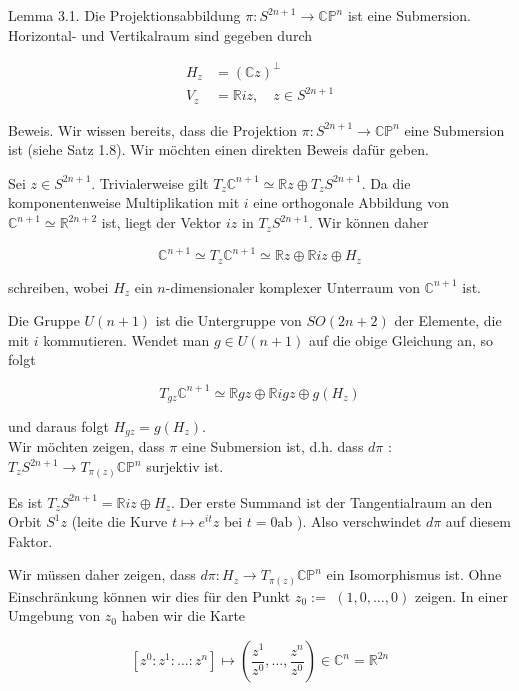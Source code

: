 \documentclass[10pt, letterpaper]{article}
\begin{document}
Lemma 3.1. Die Projektionsabbildung $\pi: S^{2 n+1} \rightarrow \mathbb{C P}^{n}$ ist eine Submersion. Horizontal- und Vertikalraum sind gegeben durch

$$
\begin{aligned}
H_{z} & =(\mathbb{C} z)^{\perp} \\
V_{z} & =\mathbb{R} i z, \quad z \in S^{2 n+1}
\end{aligned}
$$

Beweis. Wir wissen bereits, dass die Projektion $\pi: S^{2 n+1} \rightarrow \mathbb{C} \mathbb{P}^{n}$ eine Submersion ist (siehe Satz 1.8). Wir möchten einen direkten Beweis dafür geben.

Sei $z \in S^{2 n+1}$. Trivialerweise gilt $T_{z} \mathbb{C}^{n+1} \simeq \mathbb{R} z \oplus T_{z} S^{2 n+1}$. Da die komponentenweise Multiplikation mit $i$ eine orthogonale Abbildung von $\mathbb{C}^{n+1} \simeq \mathbb{R}^{2 n+2}$ ist, liegt der Vektor $i z$ in $T_{z} S^{2 n+1}$. Wir können daher

$$
\mathbb{C}^{n+1} \simeq T_{z} \mathbb{C}^{n+1} \simeq \mathbb{R} z \oplus \mathbb{R} i z \oplus H_{z}
$$

schreiben, wobei $H_{z}$ ein $n$-dimensionaler komplexer Unterraum von $\mathbb{C}^{n+1}$ ist.

Die Gruppe $U(n+1)$ ist die Untergruppe von $S O(2 n+2)$ der Elemente, die mit $i$ kommutieren. Wendet man $g \in U(n+1)$ auf die obige Gleichung an, so folgt

$$
T_{g z} \mathbb{C}^{n+1} \simeq \mathbb{R} g z \oplus \mathbb{R} i g z \oplus g\left(H_{z}\right)
$$

und daraus folgt $H_{g z}=g\left(H_{z}\right)$.\\
Wir möchten zeigen, dass $\pi$ eine Submersion ist, d.h. dass $d \pi$ : $T_{z} S^{2 n+1} \rightarrow T_{\pi(z)} \mathbb{C P}^{n}$ surjektiv ist.

Es ist $T_{z} S^{2 n+1}=\mathbb{R} i z \oplus H_{z}$. Der erste Summand ist der Tangentialraum an den Orbit $S^{1} z$ (leite die Kurve $t \mapsto e^{i t} z$ bei $t=0 \mathrm{ab}$ ). Also verschwindet $d \pi$ auf diesem Faktor.

Wir müssen daher zeigen, dass $d \pi: H_{z} \rightarrow T_{\pi(z)} \mathbb{C P}^{n}$ ein Isomorphismus ist. Ohne Einschränkung können wir dies für den Punkt $z_{0}:=$ $(1,0, \ldots, 0)$ zeigen. In einer Umgebung von $z_{0}$ haben wir die Karte

$$
\left[z^{0}: z^{1}: \ldots: z^{n}\right] \mapsto\left(\frac{z^{1}}{z^{0}}, \ldots, \frac{z^{n}}{z^{0}}\right) \in \mathbb{C}^{n}=\mathbb{R}^{2 n}
$$
\end{document}
